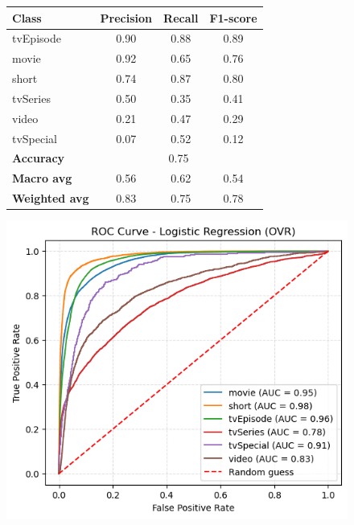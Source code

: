 \begin{figure}[ht]
    \centering
    \begin{minipage}{0.45\textwidth} 
    \centering
    \label{tab:logistic_report_t}
    \small 
    \begin{tabular}{lccc}
    \hline
    \textbf{Class} & \textbf{Precision} & \textbf{Recall} & \textbf{F1-score}\\
    \hline
    tvEpisode  & 0.90 & 0.88 & 0.89  \\
    movie      & 0.92 & 0.65 & 0.76  \\
    short      & 0.74 & 0.87 & 0.80  \\
    tvSeries   & 0.50 & 0.35 & 0.41  \\
    video      & 0.21 & 0.47 & 0.29  \\
    tvSpecial  & 0.07 & 0.52 & 0.12  \\
    \hline
    \textbf{Accuracy}    & \multicolumn{3}{c}{0.75} \\
    \textbf{Macro avg}   & 0.56 & 0.62 & 0.54  \\
    \textbf{Weighted avg}& 0.83 & 0.75 & 0.78  \\
    \hline
    \end{tabular}
    \end{minipage}
    \hfill
    \begin{minipage}{0.4\textwidth} 
    \centering
    \includegraphics[width=\textwidth]{plotsss/log_roc_curves_t.png} 
    \label{fig:log_roc_curves_t} 
    \end{minipage}
    \end{figure}


